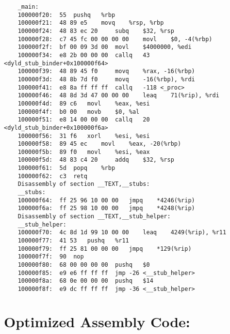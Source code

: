 \documentclass[a4paper]{article}
\begin{document}
\begin{lstlisting}
    _main:
    100000f20:	55 	pushq	%rbp
    100000f21:	48 89 e5 	movq	%rsp, %rbp
    100000f24:	48 83 ec 20 	subq	$32, %rsp
    100000f28:	c7 45 fc 00 00 00 00 	movl	$0, -4(%rbp)
    100000f2f:	bf 00 09 3d 00 	movl	$4000000, %edi
    100000f34:	e8 2b 00 00 00 	callq	43 <dyld_stub_binder+0x100000f64>
    100000f39:	48 89 45 f0 	movq	%rax, -16(%rbp)
    100000f3d:	48 8b 7d f0 	movq	-16(%rbp), %rdi
    100000f41:	e8 8a ff ff ff 	callq	-118 <_proc>
    100000f46:	48 8d 3d 47 00 00 00 	leaq	71(%rip), %rdi
    100000f4d:	89 c6 	movl	%eax, %esi
    100000f4f:	b0 00 	movb	$0, %al
    100000f51:	e8 14 00 00 00 	callq	20 <dyld_stub_binder+0x100000f6a>
    100000f56:	31 f6 	xorl	%esi, %esi
    100000f58:	89 45 ec 	movl	%eax, -20(%rbp)
    100000f5b:	89 f0 	movl	%esi, %eax
    100000f5d:	48 83 c4 20 	addq	$32, %rsp
    100000f61:	5d 	popq	%rbp
    100000f62:	c3 	retq
    Disassembly of section __TEXT,__stubs:
    __stubs:
    100000f64:	ff 25 96 10 00 00 	jmpq	*4246(%rip)
    100000f6a:	ff 25 98 10 00 00 	jmpq	*4248(%rip)
    Disassembly of section __TEXT,__stub_helper:
    __stub_helper:
    100000f70:	4c 8d 1d 99 10 00 00 	leaq	4249(%rip), %r11
    100000f77:	41 53 	pushq	%r11
    100000f79:	ff 25 81 00 00 00 	jmpq	*129(%rip)
    100000f7f:	90 	nop
    100000f80:	68 00 00 00 00 	pushq	$0
    100000f85:	e9 e6 ff ff ff 	jmp	-26 <__stub_helper>
    100000f8a:	68 0e 00 00 00 	pushq	$14
    100000f8f:	e9 dc ff ff ff 	jmp	-36 <__stub_helper>
\end{lstlisting}

\section{Optimized Assembly Code:}
\end{document}
